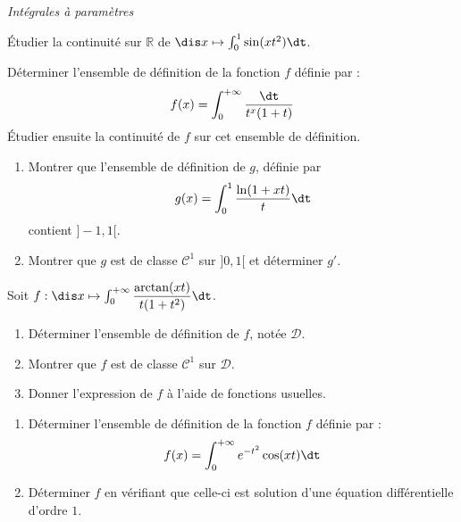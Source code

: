 \documentclass[a4paper,10pt]{report}
\begin{document}
\bigskip

\begin{center}
\textit{{ {\large Intégrales à paramètres}}}
\end{center}

\medskip

\begin{Exercice}{} Étudier la continuité sur $\mathbb{R}$ de $\dis x \mapsto \int_{0}^1 \sin(xt^2) \dt$.
\end{Exercice}



\begin{Exercice}{} Déterminer l'ensemble de définition de la fonction $f$ définie par :
$$ f(x) = \int_{0}^{+ \infty} \dfrac{\dt}{t^x(1+t)}$$
Étudier ensuite la continuité de $f$ sur cet ensemble de définition.
\end{Exercice}




\begin{Exercice}{} 
\begin{enumerate}
\item Montrer que l'ensemble de définition de $g$, définie par 
$$ g(x) = \int_{0}^1 \dfrac{\ln(1+xt)}{t} \dt$$
contient $]-1,1[$.
\item Montrer que $g$ est de classe $\mathcal{C}^1$ sur $]0,1[$ et déterminer $g'$.
\end{enumerate}
\end{Exercice}



\begin{Exercice}{} Soit $f : \dis x \mapsto \int_{0}^{+ \infty} \dfrac{\arctan(xt)}{t(1+t^2)} \dt$.
\begin{enumerate}
\item Déterminer l'ensemble de définition de $f$, notée $\mathcal{D}$.
\item Montrer que $f$ est de classe $\mathcal{C}^1$ sur $\mathcal{D}$.
\item Donner l'expression de $f$ à l'aide de fonctions usuelles.
\end{enumerate}
\end{Exercice}




\begin{Exercice}{}
\begin{enumerate}
\item Déterminer l'ensemble de définition de la fonction $f$ définie par :
$$ f(x) = \int_{0}^{+ \infty} e^{-t^2} \cos(xt) \dt$$
\item Déterminer $f$ en vérifiant que celle-ci est solution d'une équation différentielle d'ordre $1$.
\end{enumerate}
\end{Exercice}
\end{document}

